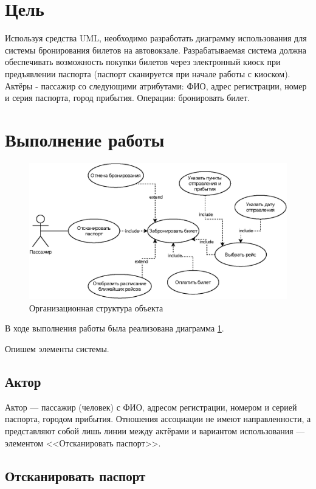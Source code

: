 \section{Цель}

Используя средства UML, необходимо разработать диаграмму использования для системы бронирования билетов на автовокзале. Разрабатываемая система должна обеспечивать возможность покупки билетов через электронный киоск при предъявлении паспорта (паспорт сканируется при начале работы с киоском). Актёры - пассажир со следующими атрибутами: ФИО, адрес регистрации, номер и серия паспорта, город прибытия. Операции: бронировать билет.

\section{Выполнение работы}

\begin{figure}[h!]
        \centering
        \includegraphics[width=\textwidth]{images/5/uml.eps}
        \caption{Организационная структура объекта}
	\label{uml}
\end{figure}

В ходе выполнения работы была реализована диаграмма \ref{uml}. 

Опишем элементы системы.

\subsection{Актор}

Актор --- пассажир (человек) с ФИО, адресом регистрации, номером и серией паспорта, городом прибытия.
Отношения ассоциации не имеют направленности, а представляют собой лишь линии между актёрами и вариантом использования --- элементом <<Отсканировать паспорт>>.

\subsection{Отсканировать паспорт}

